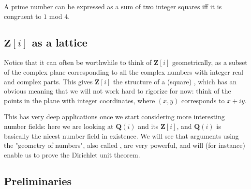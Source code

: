 \begin{theorem*}[Fermat]
  A prime number can be expressed as a sum of two integer squares iff it is
  congruent to \(1\) mod \(4\).
\end{theorem*}

\subsection{\({\mathbf Z}[i]\) as a lattice}

Notice that it can often be worthwhile to think of \({\mathbf Z}[i]\)
geometrically, as a subset of the complex plane corresponding to all the complex
numbers with integer real and complex parts. This gives \({\mathbf Z}[i]\) the
structure of a (square) , which has an obvious meaning that we
will not work hard to rigorize for now: think of the points in the plane with
integer coordinates, where \( (x,y) \) corresponds to \( x+iy \).


\begin{aside}
  This has very deep applications once we start considering more interesting
  number fields: here we are looking at \({\mathbf Q}(i)\) and its  \({\mathbf Z}[i]\), and \({\mathbf Q}(i)\) is basically the
  nicest number field in existence. We will see that arguments using the
  "geometry of numbers", also called , are very powerful, and
  will (for instance) enable us to prove the Dirichlet unit theorem.
\end{aside}
\subsection{Preliminaries}

